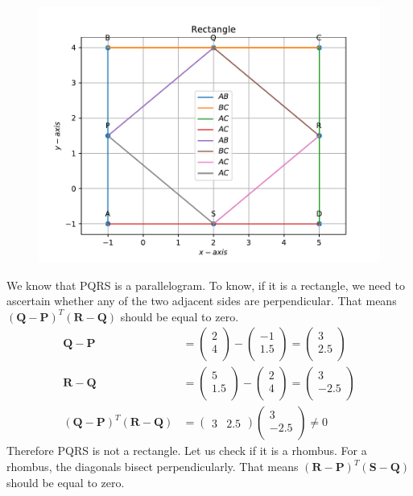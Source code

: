 \documentclass[12pt]{article}
\providecommand{\brak}[1]{\ensuremath{\left(#1\right)}}
\newcommand{\myvec}[1]{\ensuremath{\begin{pmatrix}#1\end{pmatrix}}}
\let\vec\mathbf
\begin{document}
\begin{enumerate}
\begin{figure}[!h]
	\begin{center}
		\includegraphics[width=\columnwidth]{./figs/problem2.pdf}
	\end{center}
\caption{}
\label{fig:Fig3}
\end{figure}
We know that PQRS is a parallelogram. To know, if it is a rectangle, we need to ascertain whether any of the two adjacent sides are perpendicular. 
That means $\brak{\vec{Q}-\vec{P}}^{T}\brak{\vec{R}-\vec{Q}}$ should be equal to zero. \\
\begin{align}
\vec{Q}-\vec{P} &=  \myvec{
 2 \\
 4 \\
 } - \myvec{
 -1 \\
 1.5 \\
 } = \myvec{
 3 \\
 2.5 \\ 
 } \\
 \vec{R}-\vec{Q} &=  \myvec{
 5 \\
 1.5\\
 } - \myvec{
 2 \\
 4 \\
 } = \myvec{
 3 \\
 -2.5 \\ 
 } \\ 
 \brak{\vec{Q}-\vec{P}}^{T}\brak{\vec{R}-\vec{Q}} &= \myvec{
 3 & 2.5} \myvec{
 3 \\
 -2.5 \\
 } \neq 0
\end{align}
Therefore PQRS is not a rectangle. Let us check if it is a rhombus. For a rhombus, the diagonals bisect perpendicularly. That means $\brak{\vec{R}-\vec{P}}^{T}\brak{\vec{S}-\vec{Q}}$ should be equal to zero. \\



\end{enumerate}
\end{document}
